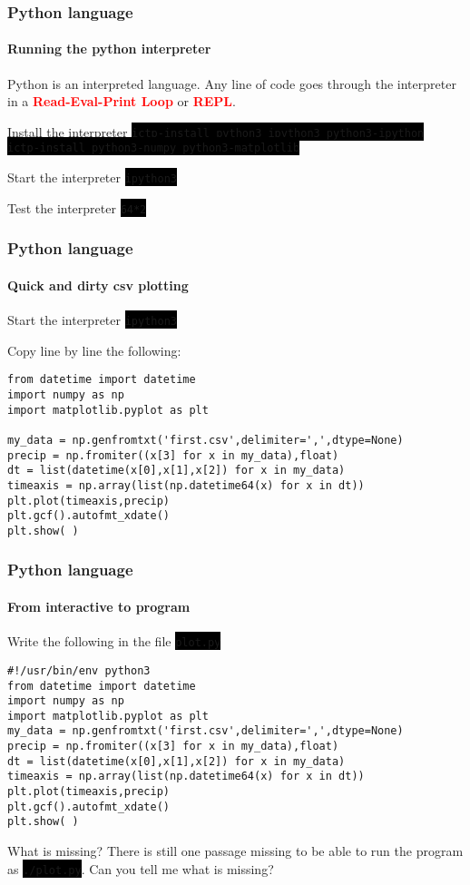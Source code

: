 \documentclass[unknownkeysallowed, 10pt, a4 paper, handout]{beamer}
\newcommand{\focus}[1]{\textbf{\textcolor{red}{#1}}}
\newcommand{\code}[1]{\colorbox{black}{\color{green}\texttt{#1}}}
\begin{document}
\begin{frame}
  \frametitle{Python language}
  \framesubtitle{Running the python interpreter}
  Python is an interpreted language. Any line of code goes through the
    interpreter in a \focus{Read-Eval-Print Loop} or \focus{REPL}.
  \begin{block}{Install the interpreter}
    \code{ictp-install python3 ipython3 python3-ipython} \\
    \code{ictp-install python3-numpy python3-matplotlib}
  \end{block}
  \begin{block}{Start the interpreter}
    \code{ipython3}
  \end{block}
  \begin{block}{Test the interpreter}
    \code{64*2}
  \end{block}
\end{frame}


\begin{frame}[fragile=singleslide]
  \frametitle{Python language}
  \framesubtitle{Quick and dirty csv plotting}
  \begin{block}{Start the interpreter}
    \code{ipython3}
  \end{block}
  \begin{exampleblock}{ }
    Copy line by line the following:
    \small{
    \begin{verbatim}
from datetime import datetime
import numpy as np
import matplotlib.pyplot as plt

my_data = np.genfromtxt('first.csv',delimiter=',',dtype=None)
precip = np.fromiter((x[3] for x in my_data),float)
dt = list(datetime(x[0],x[1],x[2]) for x in my_data)
timeaxis = np.array(list(np.datetime64(x) for x in dt))
plt.plot(timeaxis,precip)
plt.gcf().autofmt_xdate()
plt.show( )
    \end{verbatim}
    }
  \end{exampleblock}
\end{frame}

\begin{frame}[fragile=singleslide]
  \frametitle{Python language}
  \framesubtitle{From interactive to program}
  \begin{exampleblock}{}
    Write the following in the file \code{plot.py}
    \small{
    \begin{verbatim}
#!/usr/bin/env python3
from datetime import datetime
import numpy as np
import matplotlib.pyplot as plt
my_data = np.genfromtxt('first.csv',delimiter=',',dtype=None)
precip = np.fromiter((x[3] for x in my_data),float)
dt = list(datetime(x[0],x[1],x[2]) for x in my_data)
timeaxis = np.array(list(np.datetime64(x) for x in dt))
plt.plot(timeaxis,precip)
plt.gcf().autofmt_xdate()
plt.show( )
    \end{verbatim}
    }
  \end{exampleblock}

  \begin{alertblock}{What is missing?}
    There is still one passage missing to be able to run the program as
      \code{./plot.py}. Can you tell me what is missing?
  \end{alertblock}
\end{frame}
\end{document}
